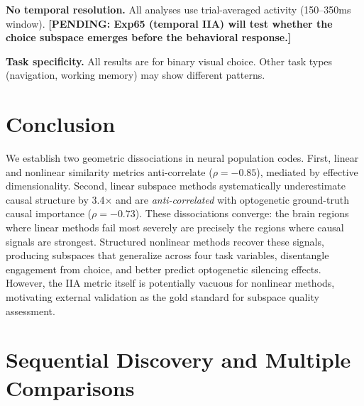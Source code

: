 \documentclass{article}
\newcommand{\pending}[1]{\textcolor{red!70!black}{\textbf{[PENDING: #1]}}}
\begin{document}
\textbf{No temporal resolution.} All analyses use trial-averaged activity (150--350ms window). \pending{Exp65 (temporal IIA) will test whether the choice subspace emerges before the behavioral response.}

\textbf{Task specificity.} All results are for binary visual choice. Other task types (navigation, working memory) may show different patterns.

\section{Conclusion}

We establish two geometric dissociations in neural population codes. First, linear and nonlinear similarity metrics anti-correlate ($\rho = -0.85$), mediated by effective dimensionality. Second, linear subspace methods systematically underestimate causal structure by 3.4$\times$ and are \emph{anti-correlated} with optogenetic ground-truth causal importance ($\rho = -0.73$). These dissociations converge: the brain regions where linear methods fail most severely are precisely the regions where causal signals are strongest. Structured nonlinear methods recover these signals, producing subspaces that generalize across four task variables, disentangle engagement from choice, and better predict optogenetic silencing effects. However, the IIA metric itself is potentially vacuous for nonlinear methods, motivating external validation as the gold standard for subspace quality assessment.




\appendix
\section{Sequential Discovery and Multiple Comparisons}
\label{app:sequential}
\end{document}
